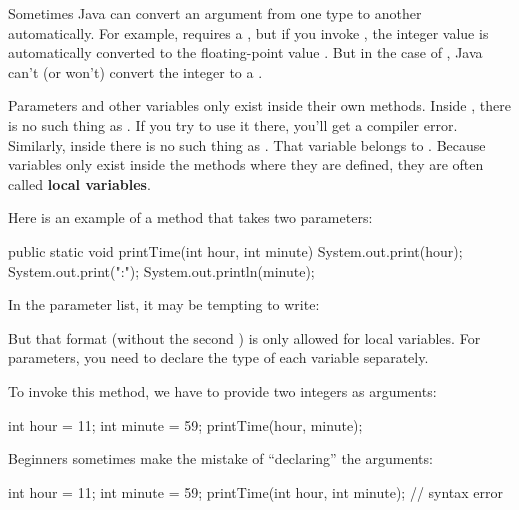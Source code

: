 Sometimes Java can convert an argument from one type to another automatically.
For example,  requires a , but if you invoke , the integer value  is automatically converted to the floating-point value .
But in the case of , Java can't (or won't) convert the integer  to a .


Parameters and other variables only exist inside their own methods.
Inside , there is no such thing as .
If you try to use it there, you'll get a compiler error.
Similarly, inside  there is no such thing as .
That variable belongs to .
Because variables only exist inside the methods where they are defined, they are often called {\bf local variables}.




Here is an example of a method that takes two parameters:

\begin{code}
public static void printTime(int hour, int minute) {
    System.out.print(hour);
    System.out.print(":");
    System.out.println(minute);
}
\end{code}

In the parameter list, it may be tempting to write:

\begin{code}
public static void printTime(int hour, minute) {  // error
\end{code}

But that format (without the second ) is only allowed for local variables.
For parameters, you need to declare the type of each variable separately.

To invoke this method, we have to provide two integers as arguments:

\begin{code}
int hour = 11;
int minute = 59;
printTime(hour, minute);
\end{code}

Beginners sometimes make the mistake of ``declaring'' the arguments:

\begin{code}
int hour = 11;
int minute = 59;
printTime(int hour, int minute);  // syntax error
\end{code}

